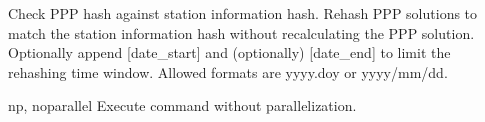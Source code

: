 \documentclass[letterpaper,10pt,english]{sphinxmanual}
\begin{document}
\begin{description}
\begin{description}
\sphinxAtStartPar
Check PPP hash against station information hash.
Rehash PPP solutions to match the station information
hash without recalculating the PPP solution.
Optionally append {[}date\_start{]} and (optionally)
{[}date\_end{]} to limit the rehashing time window. Allowed
formats are yyyy.doy or yyyy/mm/dd.

\end{description}
\begin{optionlist}{3cm}
\item [\sphinxhyphen{}np, \sphinxhyphen{}\sphinxhyphen{}noparallel]  
\sphinxAtStartPar
Execute command without parallelization.
\end{optionlist}

\end{description}
\end{document}
